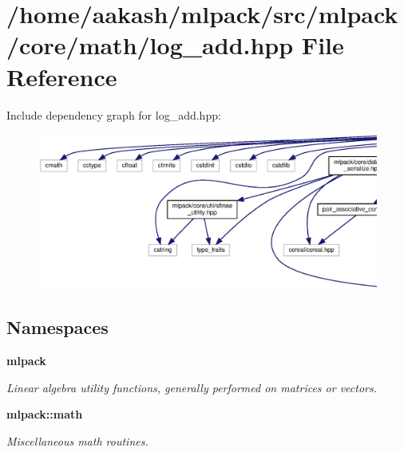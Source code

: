 \section{/home/aakash/mlpack/src/mlpack/core/math/log\+\_\+add.hpp File Reference}
\label{log__add_8hpp}
Include dependency graph for log\+\_\+add.\+hpp\+:
\nopagebreak
\begin{figure}[H]
\begin{center}
\leavevmode
\includegraphics[width=350pt]{log__add_8hpp__incl}
\end{center}
\end{figure}
\subsection*{Namespaces}
\begin{DoxyCompactItemize}
\item 
 \textbf{ mlpack}
\begin{DoxyCompactList}\small\item\em Linear algebra utility functions, generally performed on matrices or vectors. \end{DoxyCompactList}\item 
 \textbf{ mlpack\+::math}
\begin{DoxyCompactList}\small\item\em Miscellaneous math routines. \end{DoxyCompactList}\end{DoxyCompactItemize}
